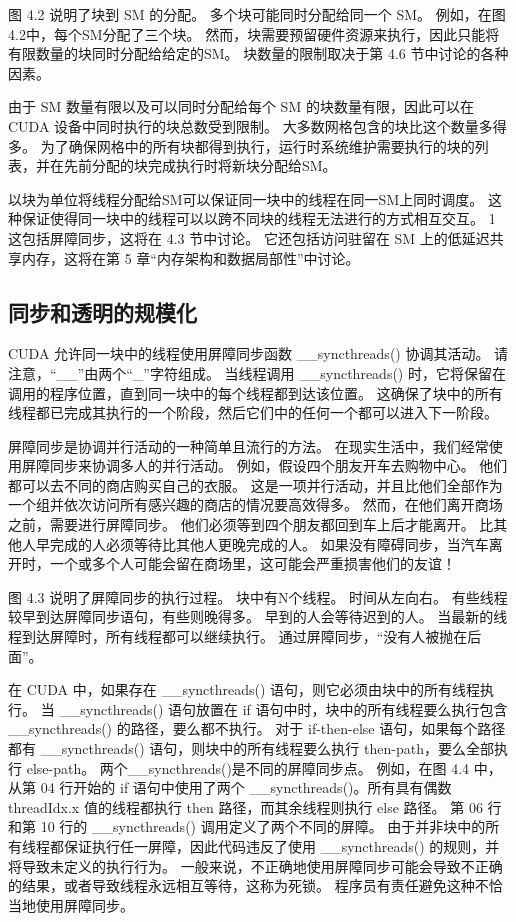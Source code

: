 图 4.2 说明了块到 SM 的分配。 多个块可能同时分配给同一个 SM。 例如，在图4.2中，每个SM分配了三个块。 然而，块需要预留硬件资源来执行，因此只能将有限数量的块同时分配给给定的SM。 块数量的限制取决于第 4.6 节中讨论的各种因素。

由于 SM 数量有限以及可以同时分配给每个 SM 的块数量有限，因此可以在 CUDA 设备中同时执行的块总数受到限制。 大多数网格包含的块比这个数量多得多。 为了确保网格中的所有块都得到执行，运行时系统维护需要执行的块的列表，并在先前分配的块完成执行时将新块分配给SM。

以块为单位将线程分配给SM可以保证同一块中的线程在同一SM上同时调度。 这种保证使得同一块中的线程可以以跨不同块的线程无法进行的方式相互交互。 1 这包括屏障同步，这将在 4.3 节中讨论。 它还包括访问驻留在 SM 上的低延迟共享内存，这将在第 5 章“内存架构和数据局部性”中讨论。

\subsection{同步和透明的规模化}
CUDA 允许同一块中的线程使用屏障同步函数 \_\_syncthreads() 协调其活动。 请注意，“\_\_”由两个“\_”字符组成。 当线程调用 \_\_syncthreads() 时，它将保留在调用的程序位置，直到同一块中的每个线程都到达该位置。 这确保了块中的所有线程都已完成其执行的一个阶段，然后它们中的任何一个都可以进入下一阶段。

屏障同步是协调并行活动的一种简单且流行的方法。 在现实生活中，我们经常使用屏障同步来协调多人的并行活动。 例如，假设四个朋友开车去购物中心。 他们都可以去不同的商店购买自己的衣服。 这是一项并行活动，并且比他们全部作为一个组并依次访问所有感兴趣的商店的情况要高效得多。 然而，在他们离开商场之前，需要进行屏障同步。 他们必须等到四个朋友都回到车上后才能离开。 比其他人早完成的人必须等待比其他人更晚完成的人。 如果没有障碍同步，当汽车离开时，一个或多个人可能会留在商场里，这可能会严重损害他们的友谊！

图 4.3 说明了屏障同步的执行过程。 块中有N个线程。 时间从左向右。 有些线程较早到达屏障同步语句，有些则晚得多。 早到的人会等待迟到的人。 当最新的线程到达屏障时，所有线程都可以继续执行。 通过屏障同步，“没有人被抛在后面”。

在 CUDA 中，如果存在 \_\_syncthreads() 语句，则它必须由块中的所有线程执行。 当 \_\_syncthreads() 语句放置在 if 语句中时，块中的所有线程要么执行包含 \_\_syncthreads() 的路径，要么都不执行。 对于 if-then-else 语句，如果每个路径都有 \_\_syncthreads() 语句，则块中的所有线程要么执行 then-path，要么全部执行 else-path。 两个\_\_syncthreads()是不同的屏障同步点。 例如，在图 4.4 中，从第 04 行开始的 if 语句中使用了两个 \_\_syncthreads()。所有具有偶数 threadIdx.x 值的线程都执行 then 路径，而其余线程则执行 else 路径。 第 06 行和第 10 行的 \_\_syncthreads() 调用定义了两个不同的屏障。 由于并非块中的所有线程都保证执行任一屏障，因此代码违反了使用 \_\_syncthreads() 的规则，并将导致未定义的执行行为。 一般来说，不正确地使用屏障同步可能会导致不正确的结果，或者导致线程永远相互等待，这称为死锁。 程序员有责任避免这种不恰当地使用屏障同步。

